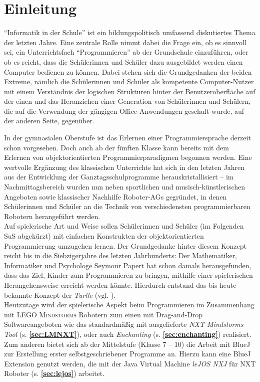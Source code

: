 \documentclass[paper=a4, DIV=calc, BCOR=12mm, twoside=on, onecolumn=on, open = right, titlepage =on, parskip =half-, headsepline = on, footsepline = off, chapterprefix = off, appendixprefix = on, fontsize = 12pt, numbers = noenddot, abstract = on]{scrbook}
\begin{document}
\chapter{Einleitung}
\onehalfspacing
"`Informatik in der Schule"' ist ein bildungspolitisch umfassend diskutiertes Thema der letzten Jahre. Eine zentrale Rolle nimmt dabei die Frage ein, ob es sinnvoll sei, ein Unterrichtsfach "`Programmieren"' ab der Grundschule einzuführen, oder ob es reicht, dass die Schülerinnen und Schüler dazu ausgebildet werden einen Computer bedienen zu können. Dabei stehen sich die Grundgedanken der beiden Extreme, nämlich die Schülerinnen und Schüler als kompetente Computer-Nutzer mit einem Verständnis der logischen Strukturen hinter der Benutzeroberfläche auf der einen und das Heranziehen einer Generation von Schülerinnen und Schülern, die auf die Verwendung der gängigen Office-Anwendungen geschult wurde, auf der anderen Seite, gegenüber.

In der gymnasialen Oberstufe ist das Erlernen einer Programmiersprache derzeit schon vorgesehen. Doch auch ab der fünften Klasse kann bereits mit dem Erlernen von objektorientierten Programmierparadigmen begonnen werden. Eine wertvolle Ergänzung des klassischen Unterrichts hat sich in den letzten Jahren aus der Entwicklung der Ganztagsschulprogramme herauskristallisiert -- im Nachmittagsbereich wurden nun neben sportlichen und musisch-künstlerischen Angeboten sowie klassischer Nachhilfe Roboter-AGs gegründet, in denen Schülerinnen und Schüler an die Technik von verschiedensten programmierbaren Robotern herangeführt werden.\\
Auf spielerische Art und Weise sollen Schülerinnen und Schüler (im Folgenden SuS abgekürzt) mit einfachen Konstrukten der objektorientierten Programmierung umzugehen lernen. Der Grundgedanke hinter diesem Konzept reicht bis in die Siebzigerjahre des letzten Jahrhunderts: Der Mathematiker, Informatiker und Psychologe Seymour Papert hat schon damals herausgefunden, dass das Ziel, Kinder zum Programmieren zu bringen, mithilfe einer spielerischen Herangehensweise erreicht werden könnte. Hierdurch entstand das bis heute bekannte Konzept der \emph{Turtle} (vgl. \cite[S.365]{nievergelt:99}).\\
Heutzutage wird der spielerische Aspekt beim Programmieren im Zusammenhang mit \textsc{LEGO Mindstorms} Robotern zum einen mit Drag-and-Drop Softwareangeboten wie das standardmäßig mit ausgelieferte \emph{NXT Mindstorms Tool} (s.  \textbf{\ref{sec:LMNXT}}), oder auch \emph{Enchanting} (s. \textbf{\ref{sec:enchanting}}) realisiert. Zum anderen bietet sich ab der Mittelstufe (Klasse 7 -- 10) die Arbeit mit BlueJ zur Erstellung erster selbstgeschriebener Programme an. Hierzu kann eine BlueJ Extension genutzt werden, die mit der Java Virtual Machine \emph{leJOS NXJ} für NXT Roboter (s. \textbf{\ref{sec:lejos}}) arbeitet.
\end{document}
